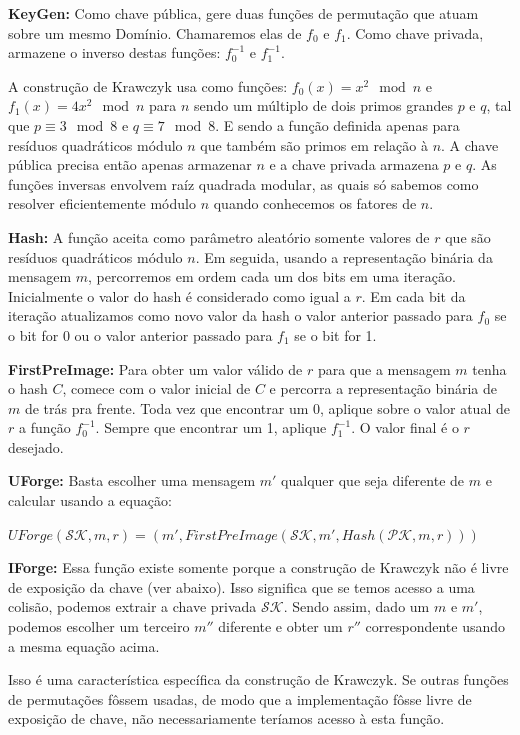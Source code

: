 \documentclass[a4paper]{article}
\begin{document}
\textbf{KeyGen: }Como chave pública, gere duas funções de permutação
que atuam sobre um mesmo Domínio. Chamaremos elas de $f_0$ e
$f_1$. Como chave privada, armazene o inverso destas funções:
$f_0^{-1}$ e $f_1^{-1}$.

A construção de Krawczyk usa como funções: $f_0(x) = x^2 \mod n$ e
$f_1(x) = 4x^2 \mod n$ para $n$ sendo um múltiplo de dois primos
grandes $p$ e $q$, tal que $p \equiv 3 \mod 8$ e $q \equiv 7 \mod
8$. E sendo a função definida apenas para resíduos quadráticos módulo
$n$ que também são primos em relação à $n$. A chave pública precisa
então apenas armazenar $n$ e a chave privada armazena $p$ e $q$. As
funções inversas envolvem raíz quadrada modular, as quais só sabemos
como resolver eficientemente módulo $n$ quando conhecemos os fatores
de $n$.

\textbf{Hash:} A função aceita como parâmetro aleatório somente
valores de $r$ que são resíduos quadráticos módulo $n$. Em seguida,
usando a representação binária da mensagem $m$, percorremos em ordem
cada um dos bits em uma iteração. Inicialmente o valor do hash é
considerado como igual a $r$. Em cada bit da iteração atualizamos como
novo valor da hash o valor anterior passado para $f_0$ se o bit for 0
ou o valor anterior passado para $f_1$ se o bit for 1.

\textbf{FirstPreImage:} Para obter um valor válido de $r$ para que a
mensagem $m$ tenha o hash $C$, comece com o valor inicial de $C$ e
percorra a representação binária de $m$ de trás pra frente. Toda vez
que encontrar um 0, aplique sobre o valor atual de $r$ a função
$f_0^{-1}$. Sempre que encontrar um 1, aplique $f_1^{-1}$. O valor
final é o $r$ desejado.

\textbf{UForge:} Basta escolher uma mensagem $m'$ qualquer que seja
diferente de $m$ e calcular usando a equação:

$UForge(\mathcal{SK}, m, r) = (m', FirstPreImage(\mathcal{SK}, m', Hash(\mathcal{PK}, m, r)))$

\textbf{IForge:} Essa função existe somente porque a construção de
Krawczyk não é livre de exposição da chave (ver abaixo). Isso
significa que se temos acesso a uma colisão, podemos extrair a chave
privada $\mathcal{SK}$. Sendo assim, dado um $m$ e $m'$, podemos
escolher um terceiro $m''$ diferente e obter um $r''$ correspondente
usando a mesma equação acima.

Isso é uma característica específica da construção de Krawczyk. Se
outras funções de permutações fôssem usadas, de modo que a
implementação fôsse livre de exposição de chave, não necessariamente
teríamos acesso à esta função.
\end{document}
